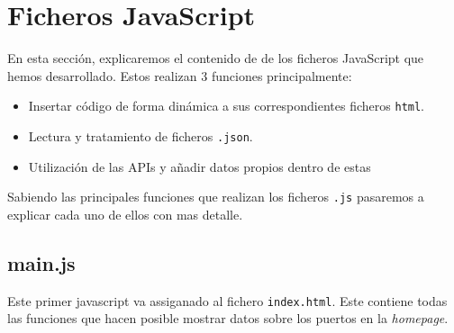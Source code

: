 \documentclass{article}
\begin{document}
\section{Ficheros JavaScript}
En esta sección, explicaremos el contenido de de los ficheros JavaScript que hemos desarrollado. Estos realizan 3 funciones principalmente:
\begin{itemize}
    \item Insertar código de forma dinámica a sus correspondientes ficheros \texttt{html}.
    \item Lectura y tratamiento de ficheros \texttt{.json}.
    \item Utilización de las APIs y añadir datos propios dentro de estas
\end{itemize}
Sabiendo las principales funciones que realizan los ficheros \texttt{.js} pasaremos a explicar cada uno de ellos con mas detalle.

\subsection{main.js}
Este primer javascript va assiganado al fichero \texttt{index.html}. Este contiene todas las funciones que hacen posible mostrar datos sobre los puertos en la \textit{homepage}.\\ 
\end{document}
